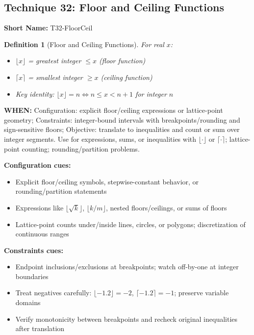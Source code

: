 \documentclass[12pt]{article}
\newtheorem{definition}{Definition}[section]
\begin{document}
\subsection{Technique 32: Floor and Ceiling Functions}
\textbf{Short Name:} T32-FloorCeil

\begin{definition}[Floor and Ceiling Functions]
For real $x$:
\begin{itemize}
    \item $\lfloor x \rfloor$ = greatest integer $\leq x$ (floor function)
    \item $\lceil x \rceil$ = smallest integer $\geq x$ (ceiling function)
    \item Key identity: $\lfloor x \rfloor = n \iff n \leq x < n+1$ for integer $n$
\end{itemize}
\end{definition}

\textbf{WHEN:} Configuration: explicit floor/ceiling expressions or lattice-point geometry; Constraints: integer-bound intervals with breakpoints/rounding and sign-sensitive floors; Objective: translate to inequalities and count or sum over integer segments. Use for expressions, sums, or inequalities with $\lfloor\cdot\rfloor$ or $\lceil\cdot\rceil$; lattice-point counting; rounding/partition problems.

\textbf{Configuration cues:}
\begin{itemize}
    \item Explicit floor/ceiling symbols, stepwise-constant behavior, or rounding/partition statements
    \item Expressions like $\lfloor\sqrt{k}\rfloor$, $\lfloor k/m\rfloor$, nested floors/ceilings, or sums of floors
    \item Lattice-point counts under/inside lines, circles, or polygons; discretization of continuous ranges
\end{itemize}

\textbf{Constraints cues:}
\begin{itemize}
    \item Endpoint inclusions/exclusions at breakpoints; watch off-by-one at integer boundaries
    \item Treat negatives carefully: $\lfloor -1.2\rfloor=-2$, $\lceil -1.2\rceil=-1$; preserve variable domains
    \item Verify monotonicity between breakpoints and recheck original inequalities after translation
\end{itemize}
\end{document}
